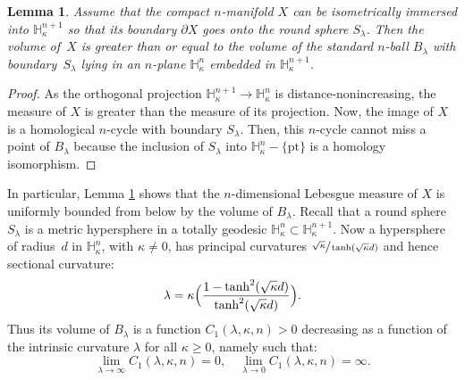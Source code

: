 \documentclass[JEP,XML,SOM,Unicode]{cedram}
\newcommand{\pt}{\mathrm{pt}}
\newtheorem{lemma}[theorem]{Lemma}
\theoremstyle{definition}
\theoremstyle{remark}
\numberwithin{equation}{section}
\begin{document}
\begin{lemma}\label{caps}
Assume that the compact $n$-manifold $X$ can be isometrically immersed into
$\mathbb H_{\kappa}^{n+1}$ so that its boundary $\partial X$ goes onto
the round sphere $S_{\lambda}$. Then the volume of~$X$
is greater than or equal to the volume of the
standard $n$-ball $B_{\lambda}$ with boundary~$S_{\lambda}$
lying in an $n$-plane
$\mathbb H_{\kappa}^{n}$ embedded in $\mathbb H_{\kappa}^{n+1}$.
\end{lemma}
\begin{proof}
As the orthogonal projection $\mathbb H_{\kappa}^{n+1}\to \mathbb H_{\kappa}^{n}$
is distance-nonincreasing, the measure of $X$ is greater
than the measure of its projection. Now, the image of $X$ is a homological
$n$-cycle with boundary $S_{\lambda}$. Then, this $n$-cycle cannot miss a point of
$B_{\lambda}$ because the inclusion of $S_{\lambda}$ into $\mathbb H_{\kappa}^{n}-\{\pt\}$
is a homology isomorphism.
\end{proof}

In particular, Lemma \ref{caps} shows that the
$n$-dimensional Lebesgue measure of $X$ is uniformly bounded
from below by the volume of $B_{\lambda}$. Recall that a round sphere~$S_{\lambda}$ is a metric hypersphere
in a totally geodesic $\mathbb H^n_{\kappa}\subset \mathbb H^{n+1}_{\kappa}$. Now a hypersphere
of \hbox{radius}~$d$ in $\mathbb H^n_{\kappa}$, with $\kappa \neq 0$, has principal curvatures
$\sfrac{\sqrt{\kappa}}{\tanh(\sqrt{\kappa}d)}$ and hence sectional curvature:
\[ \lambda =\kappa \Bigl (\frac{1- \tanh^2(\sqrt{\kappa}d)}{\tanh^2(\sqrt{\kappa}d)}\Bigr).\]
Thus its volume of $B_{\lambda}$ is a function
$C_1(\lambda,\kappa,n) >0$ decreasing as a function of
the intrinsic curvature $\lambda$ for all $\kappa\geq 0$, namely such that:
\[\lim_{\lambda\to \infty}C_1(\lambda,\kappa,n)=0, \quad
\lim_{\lambda\to 0}C_1(\lambda,\kappa,n)=\infty. \]
\end{document}
